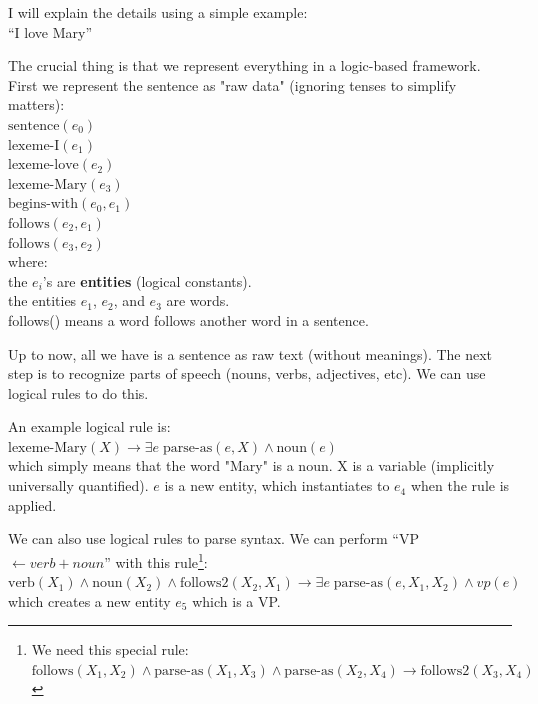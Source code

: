 \documentclass[a4paper]{report}
\begin{document}
I will explain the details using a simple example:\\
\hspace*{1cm} ``I love Mary''

The crucial thing is that we represent everything in a logic-based framework. First we represent the sentence as "raw data" (ignoring tenses to simplify matters):\\
\hspace*{1cm} $\mbox{sentence}(e_0)$\\
\hspace*{1cm} $\mbox{lexeme-I}(e_1)$\\
\hspace*{1cm} $\mbox{lexeme-love}(e_2)$\\
\hspace*{1cm} $\mbox{lexeme-Mary}(e_3)$\\
\hspace*{1cm} $\mbox{begins-with}(e_0, e_1)$\\
\hspace*{1cm} $\mbox{follows}(e_2, e_1)$\\
\hspace*{1cm} $\mbox{follows}(e_3, e_2)$\\
where:\\
\hspace*{1cm} the $e_i$'s are \textbf{entities} (logical constants).\\
\hspace*{1cm} the entities $e_1$, $e_2$, and $e_3$ are words.\\
\hspace*{1cm} follows() means a word follows another word in a sentence.

Up to now, all we have is a sentence as raw text (without meanings).  The next step is to recognize parts of speech (nouns, verbs, adjectives, etc). We can use logical rules to do this.

An example logical rule is:\\
\hspace*{1cm} $\mbox{lexeme-Mary}(X) \rightarrow \exists e \; \mbox{parse-as}(e, X) \wedge \mbox{noun}(e)$\\
which simply means that the word "Mary" is a noun. X is a variable (implicitly universally quantified). $e$ is a new entity, which instantiates to $e_4$ when the rule is applied.

We can also use logical rules to parse syntax. We can perform ``VP $\leftarrow verb + noun$'' with this rule\footnote{We need this special rule:\\
\hspace*{1cm} $\mbox{follows}(X_1, X_2) \wedge \mbox{parse-as}(X_1, X_3) \wedge \mbox{parse-as}(X_2, X_4) \rightarrow \mbox{follows2}(X_3, X_4)$ }:\\
\hspace*{1cm} $\mbox{verb}(X_1) \wedge \mbox{noun}(X_2) \wedge \mbox{follows2}(X_2, X_1) \rightarrow \exists e \; \mbox{parse-as}(e, X_1, X_2) \wedge vp(e)$\\
which creates a new entity $e_5$ which is a VP.
\end{document}
